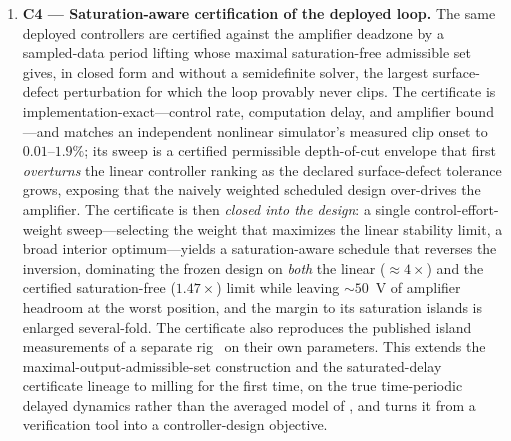 \documentclass[preprint,12pt]{elsarticle}
\begin{document}
\begin{enumerate}
not the grid LPV synthesis itself, is the formal stability guarantee,
extending closed-loop stability-lobe practice
\cite{zhang2019discrete,lehotzky2021milling} to scheduled controllers.
\item \textbf{C4 --- Saturation-aware certification of the deployed
loop.} The same deployed controllers are certified against the
amplifier deadzone by a sampled-data period lifting whose maximal
saturation-free admissible set gives, in closed form and without a
semidefinite solver, the largest surface-defect perturbation for which
the loop provably never clips. The certificate is
implementation-exact---control rate, computation delay, and
amplifier bound---and matches an independent nonlinear simulator's
measured clip onset to $0.01$--$1.9\%$; its sweep is a certified
permissible depth-of-cut envelope that first \emph{overturns} the
linear controller ranking as the declared surface-defect tolerance
grows, exposing that the naively weighted scheduled design over-drives
the amplifier. The certificate is then \emph{closed into the design}:
a single control-effort-weight sweep---selecting the weight that
maximizes the linear stability limit, a broad interior optimum---yields
a saturation-aware schedule that reverses the inversion, dominating the
frozen design on \emph{both} the linear ($\approx 4\times$) and the
certified saturation-free ($1.47\times$) limit while leaving $\sim 50$~V
of amplifier headroom at the worst position, and the margin to its
saturation islands is enlarged several-fold. The certificate also
reproduces the published island measurements of a separate
rig~\cite{ozsoy2025mssp} on their own parameters. This extends the maximal-output-admissible-set construction
\cite{gilbert1991maximal} and the saturated-delay certificate lineage
\cite{tarbouriech2011book,fu2013delay,altshuller2008siam} to milling
for the first time, on the true time-periodic delayed dynamics rather
than the averaged model of \cite{wu2016adaptive}, and turns it from a
verification tool into a controller-design objective.
\end{enumerate}
\end{document}

